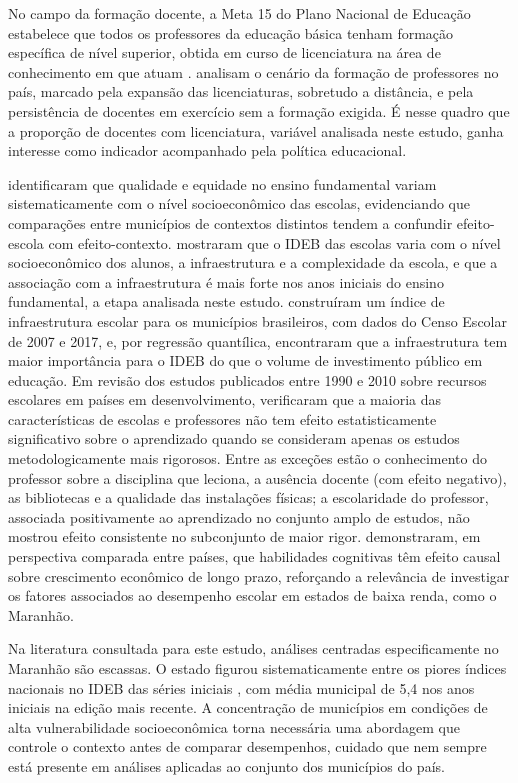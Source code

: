 No campo da formação docente, a Meta 15 do Plano Nacional de Educação estabelece que todos os professores da educação básica tenham formação específica de nível superior, obtida em curso de licenciatura na área de conhecimento em que atuam \citep{brasil2014}. \citet{gatti2019} analisam o cenário da formação de professores no país, marcado pela expansão das licenciaturas, sobretudo a distância, e pela persistência de docentes em exercício sem a formação exigida. É nesse quadro que a proporção de docentes com licenciatura, variável analisada neste estudo, ganha interesse como indicador acompanhado pela política educacional.

\citet{albernaz2002} identificaram que qualidade e equidade no ensino fundamental variam sistematicamente com o nível socioeconômico das escolas, evidenciando que comparações entre municípios de contextos distintos tendem a confundir efeito-escola com efeito-contexto. \citet{alves2013} mostraram que o IDEB das escolas varia com o nível socioeconômico dos alunos, a infraestrutura e a complexidade da escola, e que a associação com a infraestrutura é mais forte nos anos iniciais do ensino fundamental, a etapa analisada neste estudo. \citet{vasconcelos2021} construíram um índice de infraestrutura escolar para os municípios brasileiros, com dados do Censo Escolar de 2007 e 2017, e, por regressão quantílica, encontraram que a infraestrutura tem maior importância para o IDEB do que o volume de investimento público em educação. Em revisão dos estudos publicados entre 1990 e 2010 sobre recursos escolares em países em desenvolvimento, \citet{glewwe2013} verificaram que a maioria das características de escolas e professores não tem efeito estatisticamente significativo sobre o aprendizado quando se consideram apenas os estudos metodologicamente mais rigorosos. Entre as exceções estão o conhecimento do professor sobre a disciplina que leciona, a ausência docente (com efeito negativo), as bibliotecas e a qualidade das instalações físicas; a escolaridade do professor, associada positivamente ao aprendizado no conjunto amplo de estudos, não mostrou efeito consistente no subconjunto de maior rigor. \citet{hanushek2012} demonstraram, em perspectiva comparada entre países, que habilidades cognitivas têm efeito causal sobre crescimento econômico de longo prazo, reforçando a relevância de investigar os fatores associados ao desempenho escolar em estados de baixa renda, como o Maranhão.

Na literatura consultada para este estudo, análises centradas especificamente no Maranhão são escassas. O estado figurou sistematicamente entre os piores índices nacionais no IDEB das séries iniciais \citep{inep2025}, com média municipal de 5,4 nos anos iniciais na edição mais recente. A concentração de municípios em condições de alta vulnerabilidade socioeconômica torna necessária uma abordagem que controle o contexto antes de comparar desempenhos, cuidado que nem sempre está presente em análises aplicadas ao conjunto dos municípios do país.

